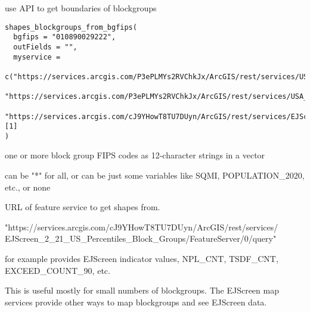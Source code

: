 \documentclass[a4paper]{book}
\begin{document}
%
\begin{SeeAlso}\relax
{}  
\end{SeeAlso}
%
\begin{Description}\relax
use API to get boundaries of blockgroups
\end{Description}
%
\begin{Usage}
\begin{verbatim}
shapes_blockgroups_from_bgfips(
  bgfips = "010890029222",
  outFields = "",
  myservice =
    c("https://services.arcgis.com/P3ePLMYs2RVChkJx/ArcGIS/rest/services/USA_Boundaries_2022/FeatureServer/5/query",
    "https://services.arcgis.com/P3ePLMYs2RVChkJx/ArcGIS/rest/services/USA_Block_Groups/FeatureServer/0/query",
    "https://services.arcgis.com/cJ9YHowT8TU7DUyn/ArcGIS/rest/services/EJScreen_2_21_US_Percentiles_Block_Groups/FeatureServer/0/query")[1]
)
\end{verbatim}
\end{Usage}
%
\begin{Arguments}
\begin{ldescription}
\item[\code{bgfips}] one or more block group FIPS codes as 12-character strings in a vector

\item[\code{outFields}] can be "*" for all, or can be
just some variables like SQMI, POPULATION\_2020, etc., or none

\item[\code{myservice}] URL of feature service to get shapes from.

"https://services.arcgis.com/cJ9YHowT8TU7DUyn/ArcGIS/rest/services/
EJScreen\_2\_21\_US\_Percentiles\_Block\_Groups/FeatureServer/0/query"

for example provides EJScreen indicator values, NPL\_CNT, TSDF\_CNT, EXCEED\_COUNT\_90, etc.
\end{ldescription}
\end{Arguments}
%
\begin{Details}\relax
This is useful mostly for small numbers of blockgroups.
The EJScreen map services provide other ways to map blockgroups and see EJScreen data.
\end{Details}
\end{document}
